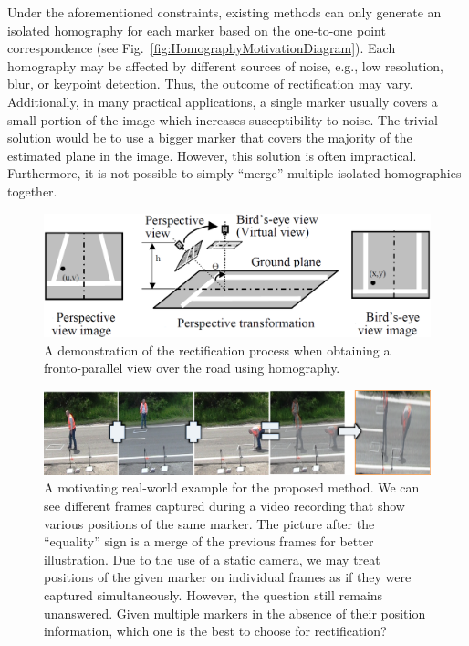 Under the aforementioned constraints, existing methods can only generate an isolated homography for each marker based on the one-to-one point correspondence (see Fig.~\ref{fig:HomographyMotivationDiagram}). Each homography may be affected by different sources of noise, e.g., low resolution, blur, or keypoint detection. Thus, the outcome of rectification may vary. Additionally, in many practical applications, a single marker usually covers a small portion of the image which increases susceptibility to noise. The trivial solution would be to use a bigger marker that covers the majority of the estimated plane in the image. However, this solution is often impractical. Furthermore, it is not possible to simply ``merge'' multiple isolated homographies together.

\begin{figure}[t]
    \centerline{\includegraphics[width=0.8\linewidth]{figures/homography/road_rectification.png}}
    \caption[Road rectification]{A demonstration of the rectification process when obtaining a fronto-parallel view over the road using homography. }
    \label{fig:RoadRectification}
\end{figure}

\begin{figure}[t]
    \centerline{\includegraphics[width=\linewidth]{figures/homography/markers_on_the_road.png}}
    \caption[Multiple markers on the road]{A motivating real-world example for the proposed method. We can see different frames captured during a video recording that show various positions of the same marker. The picture after the ``equality'' sign is a merge of the previous frames for better illustration. Due to the use of a static camera, we may treat positions of the given marker on individual frames as if they were captured simultaneously. However, the question still remains unanswered. Given multiple markers in the absence of their position information, which one is the best to choose for rectification?}
    \label{fig:MultipleMarkersOnRoad}
\end{figure}


